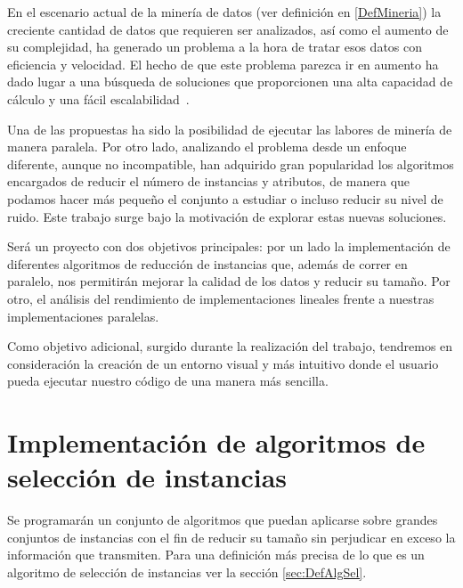

En el escenario actual de la minería de datos (ver definición en \ref{DefMineria}) la creciente cantidad de datos que requieren ser analizados, así como el aumento de su complejidad,  ha generado un problema a la hora de tratar esos datos con eficiencia y velocidad. El hecho de que este problema parezca ir en aumento ha dado lugar a una búsqueda de soluciones que proporcionen una alta capacidad de cálculo y una fácil escalabilidad~\cite{DataMiningConcepts}. 

Una de las propuestas ha sido la posibilidad de ejecutar las labores de minería de manera paralela. Por otro lado, analizando el problema desde un enfoque diferente, aunque no incompatible, han adquirido gran popularidad los algoritmos encargados de reducir el número de instancias y atributos, de manera que podamos hacer más pequeño el conjunto a estudiar o incluso reducir su nivel de ruido. Este trabajo surge bajo la motivación de explorar estas nuevas soluciones. 

Será un proyecto con dos objetivos principales: por un lado la implementación de diferentes algoritmos de reducción de instancias que, además de correr en paralelo, nos permitirán mejorar la calidad de los datos y reducir su tamaño. Por otro, el análisis del rendimiento de implementaciones lineales frente a nuestras implementaciones paralelas.

Como objetivo adicional, surgido durante la realización del trabajo, tendremos en consideración la creación de un entorno visual y más intuitivo donde el usuario pueda ejecutar nuestro código de una manera más sencilla.

\section{Implementación de algoritmos de selección de instancias}

Se programarán un conjunto de algoritmos que puedan aplicarse sobre grandes conjuntos de instancias con el fin de reducir su tamaño sin perjudicar en exceso la información que transmiten. Para una definición más precisa de lo que es un algoritmo de selección de instancias ver la sección \ref{sec:DefAlgSel}.

